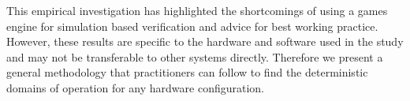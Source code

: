 \documentclass[letterpaper, 10 pt, journal, twoside]{IEEEtran}
\begin{document}

This empirical investigation has highlighted the shortcomings of using a games engine for simulation based verification and advice for best working practice. However, these results are specific to the hardware and software used in the study and may not be transferable to other systems directly. Therefore we present a general methodology that practitioners can follow to find the deterministic domains of operation for any hardware configuration.





\end{document}
